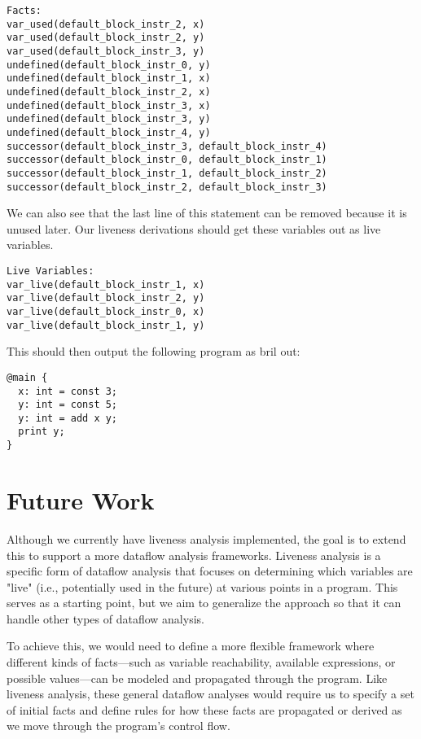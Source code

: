 \documentclass{article}
\begin{document}
\begin{lstlisting}
Facts:
var_used(default_block_instr_2, x)
var_used(default_block_instr_2, y)
var_used(default_block_instr_3, y)
undefined(default_block_instr_0, y)
undefined(default_block_instr_1, x)
undefined(default_block_instr_2, x)
undefined(default_block_instr_3, x)
undefined(default_block_instr_3, y)
undefined(default_block_instr_4, y)
successor(default_block_instr_3, default_block_instr_4)
successor(default_block_instr_0, default_block_instr_1)
successor(default_block_instr_1, default_block_instr_2)
successor(default_block_instr_2, default_block_instr_3)
\end{lstlisting}

We can also see that the last line of this statement can be removed because it is unused later. Our liveness derivations should get these variables out as live variables.

\begin{lstlisting}
Live Variables:
var_live(default_block_instr_1, x)
var_live(default_block_instr_2, y)
var_live(default_block_instr_0, x)
var_live(default_block_instr_1, y)
\end{lstlisting}

This should then output the following program as bril out:
\begin{lstlisting}
@main {
  x: int = const 3;
  y: int = const 5;
  y: int = add x y;
  print y;
}
\end{lstlisting}

\section{Future Work}
Although we currently have liveness analysis implemented, the goal is to extend this to support a more dataflow analysis frameworks. Liveness analysis is a specific form of dataflow analysis that focuses on determining which variables are "live" (i.e., potentially used in the future) at various points in a program. This serves as a starting point, but we aim to generalize the approach so that it can handle other types of dataflow analysis.

To achieve this, we would need to define a more flexible framework where different kinds of facts—such as variable reachability, available expressions, or possible values—can be modeled and propagated through the program. Like liveness analysis, these general dataflow analyses would require us to specify a set of initial facts and define rules for how these facts are propagated or derived as we move through the program’s control flow.
\end{document}
